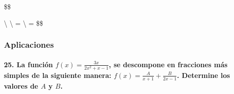 \documentclass[
]{article}
\begin{document}
\$\$ 






\textbackslash{} \therefore \textbackslash{} \cos{\theta}
= \textbackslash{} \sin{\theta} =  \$\$

\hypertarget{aplicaciones}{%
\subsubsection{Aplicaciones}\label{aplicaciones}}

\hypertarget{la-funciuxf3n-fx-frac3x2x2x-1-se-descompone-en-fracciones-muxe1s-simples-de-la-siguiente-manera-fx-fracax1-fracb2x-1.-determine-los-valores-de-a-y-b.}{%
\paragraph{\texorpdfstring{25. La función
\(f(x) = \frac{3x}{2x^2+x-1}\), se descompone en fracciones más simples
de la siguiente manera: \(f(x) = \frac{A}{x+1} + \frac{B}{2x-1}\).
Determine los valores de \(A\) y
\(B\).}{25. La función f(x) = \textbackslash frac\{3x\}\{2x\^{}2+x-1\}, se descompone en fracciones más simples de la siguiente manera: f(x) = \textbackslash frac\{A\}\{x+1\} + \textbackslash frac\{B\}\{2x-1\}. Determine los valores de A y B.}}\label{la-funciuxf3n-fx-frac3x2x2x-1-se-descompone-en-fracciones-muxe1s-simples-de-la-siguiente-manera-fx-fracax1-fracb2x-1.-determine-los-valores-de-a-y-b.}}
\end{document}
